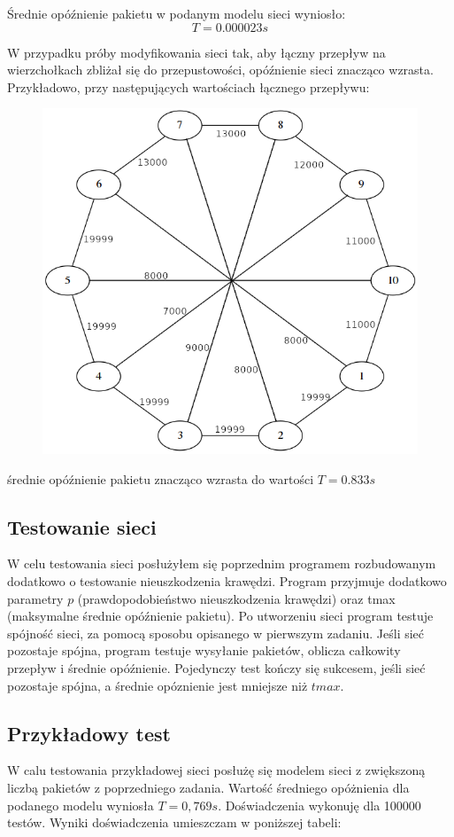 \documentclass[titlepage]{article}
\begin{document}
Średnie opóźnienie pakietu w podanym modelu sieci wyniosło:
\begin{equation*}
	T = 0.000023 s
\end{equation*}

\newpage
W przypadku próby modyfikowania sieci tak, aby łączny przepływ na wierzchołkach zbliżał się do przepustowości, opóźnienie sieci znacząco wzrasta. Przykładowo, przy następujących wartościach łącznego przepływu:

\begin{figure}[h!]
	\centering
	\includegraphics[width=0.8\linewidth]{graph7.png}
\end{figure}

średnie opóźnienie pakietu znacząco wzrasta do wartości $T = 0.833 s$

\subsection{Testowanie sieci}
W celu testowania sieci posłużyłem się poprzednim programem rozbudowanym dodatkowo o testowanie nieuszkodzenia krawędzi. Program przyjmuje dodatkowo parametry $p$ (prawdopodobieństwo nieuszkodzenia krawędzi) oraz tmax (maksymalne średnie opóźnienie pakietu). Po utworzeniu sieci program testuje spójność sieci, za pomocą sposobu opisanego w pierwszym zadaniu. Jeśli sieć pozostaje spójna, program testuje wysyłanie pakietów, oblicza całkowity przepływ i średnie opóźnienie. Pojedynczy test kończy się sukcesem, jeśli sieć pozostaje spójna, a średnie opóznienie jest mniejsze niż $tmax$.

\newpage
\subsection{Przykładowy test}
W calu testowania przykładowej sieci posłużę się modelem sieci z zwiększoną liczbą pakietów z poprzedniego zadania. Wartość średniego opóżnienia dla podanego modelu wyniosła $T = 0,769 s$. Doświadczenia wykonuję dla 100000 testów. Wyniki doświadczenia umieszczam w poniższej tabeli:
\end{document}

